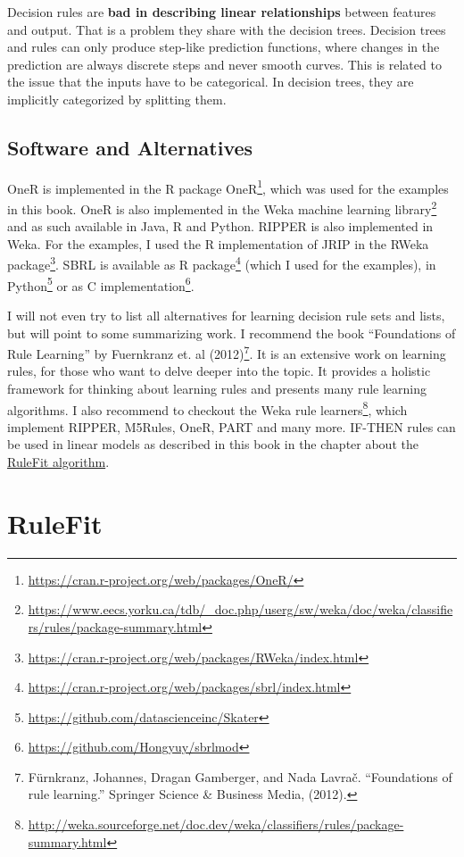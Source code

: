 \documentclass[12pt,]{krantz}
\renewcommand{\href}[2]{#2\footnote{\url{#1}}}
\begin{document}
Decision rules are \textbf{bad in describing linear relationships}
between features and output. That is a problem they share with the
decision trees. Decision trees and rules can only produce step-like
prediction functions, where changes in the prediction are always
discrete steps and never smooth curves. This is related to the issue
that the inputs have to be categorical. In decision trees, they are
implicitly categorized by splitting them.

\subsection{Software and Alternatives}\label{software-and-alternatives}

OneR is implemented in the
\href{https://cran.r-project.org/web/packages/OneR/}{R package OneR},
which was used for the examples in this book. OneR is also implemented
in the
\href{https://www.eecs.yorku.ca/tdb/_doc.php/userg/sw/weka/doc/weka/classifiers/rules/package-summary.html}{Weka
machine learning library} and as such available in Java, R and Python.
RIPPER is also implemented in Weka. For the examples, I used the R
implementation of JRIP in the
\href{https://cran.r-project.org/web/packages/RWeka/index.html}{RWeka
package}. SBRL is available as
\href{https://cran.r-project.org/web/packages/sbrl/index.html}{R
package} (which I used for the examples), in
\href{https://github.com/datascienceinc/Skater}{Python} or as
\href{https://github.com/Hongyuy/sbrlmod}{C implementation}.

I will not even try to list all alternatives for learning decision rule
sets and lists, but will point to some summarizing work. I recommend the
book ``Foundations of Rule Learning'' by Fuernkranz et. al
(2012)\footnote{Fürnkranz, Johannes, Dragan Gamberger, and Nada Lavrač.
  ``Foundations of rule learning.'' Springer Science \& Business Media,
  (2012).}. It is an extensive work on learning rules, for those who
want to delve deeper into the topic. It provides a holistic framework
for thinking about learning rules and presents many rule learning
algorithms. I also recommend to checkout the
\href{http://weka.sourceforge.net/doc.dev/weka/classifiers/rules/package-summary.html}{Weka
rule learners}, which implement RIPPER, M5Rules, OneR, PART and many
more. IF-THEN rules can be used in linear models as described in this
book in the chapter about the \protect\hyperlink{rulefit}{RuleFit
algorithm}.

\newpage

\hypertarget{rulefit}{\section{RuleFit}\label{rulefit}}
\end{document}
